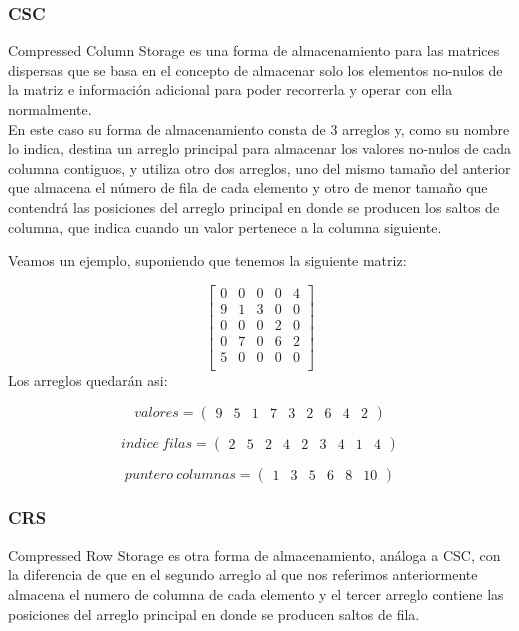 \subsubsection{CSC}
Compressed Column Storage es una forma de almacenamiento para las matrices dispersas que se basa en el concepto de almacenar solo los elementos no-nulos de la matriz e información adicional para poder recorrerla y operar con ella normalmente. \\
En este caso su forma de almacenamiento consta de 3 arreglos y, como su nombre lo indica, destina un arreglo principal para almacenar los valores no-nulos de cada columna contiguos, y utiliza otro dos arreglos, uno del mismo tamaño del anterior que almacena el número de fila de cada elemento y otro de menor tamaño que contendrá las posiciones del arreglo principal en donde se producen los saltos de columna, que indica cuando un valor pertenece a la columna siguiente.

Veamos un ejemplo, suponiendo que tenemos la siguiente matriz:


   $$ 
\begin{bmatrix}
       0    &      0    &   0       &   0           &  4    \\
       9    &   1  &   3 &   0           &   0    \\
       0    &      0    &   0       &  2      &   0    \\
       0    &      7    &   0       &   6      &   2    \\
 5    &      0    &   0       &   0           &   0    \\
\end{bmatrix} 
$$
Los arreglos quedarán asi:


\[ valores= \left( \begin{array}{ccccccccc}
9 & 5 & 1 & 7 & 3 & 2 & 6 & 4 & 2\end{array} 
\right)\] 

\[ indice\ filas = \left( \begin{array}{ccccccccc}
2 & 5 & 2 & 4 & 2 & 3 & 4 & 1 & 4\end{array} 
\right)\] 

\[ puntero\ columnas = \left( \begin{array}{cccccc}
1 & 3 & 5 & 6 & 8 & 10\end{array} 
\right)\] 

\subsubsection{CRS}
Compressed Row Storage es otra forma de almacenamiento, análoga a CSC, con la diferencia de que en el segundo arreglo al que nos referimos anteriormente almacena el numero de columna de cada elemento y el tercer arreglo contiene las posiciones del arreglo principal en donde se producen saltos de fila.

